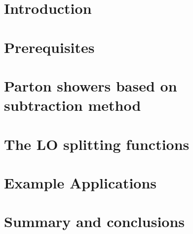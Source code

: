 \documentclass[12pt,a4paper,oneside]{report}
\begin{document}
    \parindent=0pt
    \linespread{1.2}
    \thispagestyle{plain}


\newpage
\thispagestyle{empty}
\quad
\newpage

\newpage
\thispagestyle{empty}
\quad
\newpage


\newpage
\thispagestyle{empty}
\quad
\newpage

\tableofcontents
\thispagestyle{empty}

\newpage
\thispagestyle{empty}
\quad
\newpage

\chapter{Introduction}

\newpage
\thispagestyle{empty}
\quad
\newpage
\chapter{Prerequisites}

\chapter{Parton showers based on subtraction method}
\label{Introduction}

\newpage



\label{parametrisation}
\newpage

\chapter{The LO splitting functions}
\label{LO}

\newpage

\newpage
 
\newpage
  
\newpage
\chapter{Example Applications}

\chapter{Summary and conclusions}
\label{Summary}
  
  
\newpage
\thispagestyle{empty}
\quad
\newpage
\end{document}

